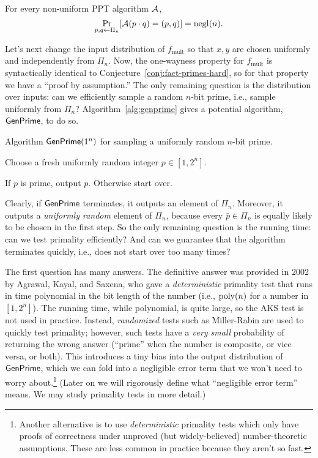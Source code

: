 \documentclass[11pt]{article}
\begin{document}
\begin{conjecture}
  \label{conj:fact-primes-hard}
  For every non-uniform PPT algorithm $\mathcal{A}$,
  \[ \Pr_{p,q \gets \Pi_{n}} [\mathcal{A}(p \cdot q) = (p,q)] = \operatorname{negl}(n). \]
\end{conjecture}

Let's next change the input distribution of $f_{\text{mult}}$ so that
$x,y$ are chosen uniformly and independently from $\Pi_{n}$.  Now, the
one-wayness property for $f_{\text{mult}}$ is syntactically identical
to Conjecture~\ref{conj:fact-primes-hard}, so for that property we
have a ``proof by assumption.''  The only remaining question is the
distribution over inputs: can we efficiently sample a random $n$-bit
prime, i.e., sample uniformly from $\Pi_{n}$?
Algorithm~\ref{alg:genprime} gives a potential algorithm,
$\mathsf{GenPrime}$, to do so.

\begin{algorithm}
  \caption{Algorithm $\mathsf{GenPrime}(1^{n})$ for sampling a uniformly
    random $n$-bit prime.}
  \label{alg:genprime}
  \begin{algorithmic}[1]
    \STATE Choose a fresh uniformly random integer $p \in [1, 2^{n}]$.

    \STATE If $p$ is prime, output $p$.  Otherwise start over.
  \end{algorithmic}
\end{algorithm}

Clearly, if $\mathsf{GenPrime}$ terminates, it outputs an element of
$\Pi_{n}$.  Moreover, it outputs a \emph{uniformly random} element of
$\Pi_{n}$, because every $\bar{p} \in \Pi_{n}$ is equally likely to be
chosen in the first step.  So the only remaining question is the
running time: can we test primality efficiently?  And can we guarantee
that the algorithm terminates quickly, i.e., does not start over too
many times?

The first question has many answers.  The definitive answer was
provided in 2002 by Agrawal, Kayal, and Saxena, who gave a
\emph{deterministic} primality test that runs in time polynomial in
the bit length of the number (i.e., $\operatorname{poly}(n)$ for a number in
$[1,2^{n}]$).  The running time, while polynomial, is quite large, so
the AKS test is not used in practice.  Instead, \emph{randomized}
tests such as Miller-Rabin are used to quickly test primality;
however, such tests have a \emph{very small} probability of returning
the wrong answer (``prime'' when the number is composite, or vice
versa, or both).  This introduces a tiny bias into the output
distribution of $\mathsf{GenPrime}$, which we can fold into a negligible
error term that we won't need to worry about.\footnote{Another
  alternative is to use \emph{deterministic} primality tests which
  only have proofs of correctness under unproved (but widely-believed)
  number-theoretic assumptions.  These are less common in practice
  because they aren't so fast.}  (Later on we will rigorously define
what ``negligible error term'' means.  We may study primality tests in
more detail.)
\end{document}
